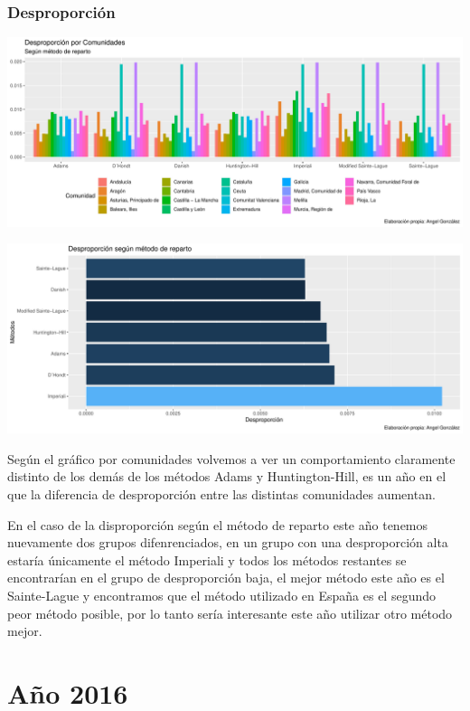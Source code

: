 \documentclass[12pt,a4paper,]{book}
\numberwithin{dummy}{section}
\theoremstyle{ocrenumbox}
\theoremstyle{blacknumex}
\theoremstyle{blacknumbox}
\theoremstyle{ocrenum}
\theoremstyle{ocrenum}
\begin{document}
\hypertarget{desproporciuxf3n-11}{%
\subsubsection{Desproporción}\label{desproporciuxf3n-11}}

\begin{center}\includegraphics[width=0.95\linewidth]{figurasR/unnamed-chunk-159-1} \end{center}

\begin{center}\includegraphics[width=0.95\linewidth]{figurasR/unnamed-chunk-159-2} \end{center}

Según el gráfico por comunidades volvemos a ver un comportamiento
claramente distinto de los demás de los métodos Adams y Huntington-Hill,
es un año en el que la diferencia de desproporción entre las distintas
comunidades aumentan.

En el caso de la disproporción según el método de reparto este año
tenemos nuevamente dos grupos difenrenciados, en un grupo con una
desproporción alta estaría únicamente el método Imperiali y todos los
métodos restantes se encontrarían en el grupo de desproporción baja, el
mejor método este año es el Sainte-Lague y encontramos que el método
utilizado en España es el segundo peor método posible, por lo tanto
sería interesante este año utilizar otro método mejor.

\hypertarget{auxf1o-2016}{%
\section{Año 2016}\label{auxf1o-2016}}
\end{document}
